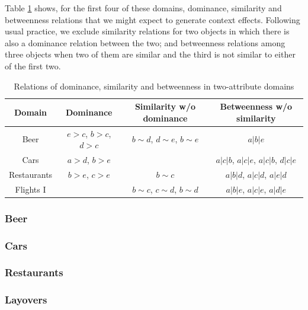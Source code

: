\documentclass[11pt,letter]{article}
\begin{document}
Table \ref{t:CE} shows, for the first four of these domains, dominance, similarity and betweenness relations that we might expect to generate context effects.
Following usual practice, we exclude similarity relations for two objects in which there is also a dominance relation between the two; and betweenness relations among three objects when two of them are similar and the third is not similar to either of the first two.

\begin{table}
	\centering
	\begin{tabular}{cccc}
		Domain & Dominance & Similarity w/o dominance & Betweenness w/o similarity \\
		\hline
		Beer
		& $e>c$, $b>c$, $d>c$ & $b \sim d$, $d \sim e$, $b \sim e$
		& $a|b|e$ \\
		Cars
		& $a>d$, $b>e$ & & $a|c|b$, $a|c|e$, $a|c|b$, $d|c|e$ \\
		Restaurants
		& $b>e$, $c>e$ & $b \sim c$ & $a|b|d$, $a|c|d$, $a|e|d$ \\
		Flights I 
		& & $b \sim c$, $c \sim d$, $b \sim d$ & $a|b|e$, $a|c|e$, $a|d|e$ \\
		\hline
	\end{tabular}\caption{Relations of dominance, similarity and betweenness in two-attribute domains}\label{t:CE}
\end{table}

\subsubsection{Beer}



\subsubsection{Cars}



\subsubsection{Restaurants}



\subsubsection{Layovers}


\end{document}
